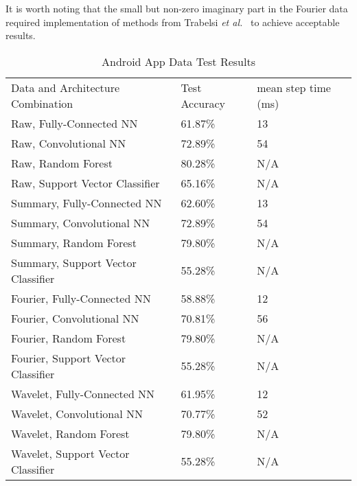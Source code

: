 \renewcommand{\thefootnote}{1}
It is worth noting that the small but non-zero imaginary part in the Fourier data required implementation of methods from Trabelsi \textit{et al.}~\cite{trabelsi2017deep} to achieve acceptable results.

\begin{table}[ht]
\caption{Android App Data Test Results}
\centering
\label{Tab:test}	
\begin{tabular}{lll}
Data and Architecture Combination & Test Accuracy & mean step time (ms) \\
Raw, Fully-Connected NN            & 61.87\%         & 13\\
Raw, Convolutional NN              & 72.89\%         & 54\\
Raw, Random Forest                 & 80.28\%         & N/A\\ 
Raw, Support Vector Classifier     & 65.16\%         & N/A\\    
Summary, Fully-Connected NN        & 62.60\%         & 13\\
Summary, Convolutional NN          & 72.89\%         & 54\\
Summary, Random Forest             & 79.80\%         & N/A\\
Summary, Support Vector Classifier & 55.28\%         & N/A\\  
Fourier, Fully-Connected NN        & 58.88\%         & 12\\
Fourier, Convolutional NN          & 70.81\%         & 56\\
Fourier, Random Forest             & 79.80\%         & N/A\\
Fourier, Support Vector Classifier & 55.28\%         & N/A\\  
Wavelet, Fully-Connected NN        & 61.95\%         & 12\\
Wavelet, Convolutional NN          & 70.77\%         & 52\\
Wavelet, Random Forest             & 79.80\%         & N/A\\
Wavelet, Support Vector Classifier & 55.28\%         & N/A           
\end{tabular}
\end{table}


